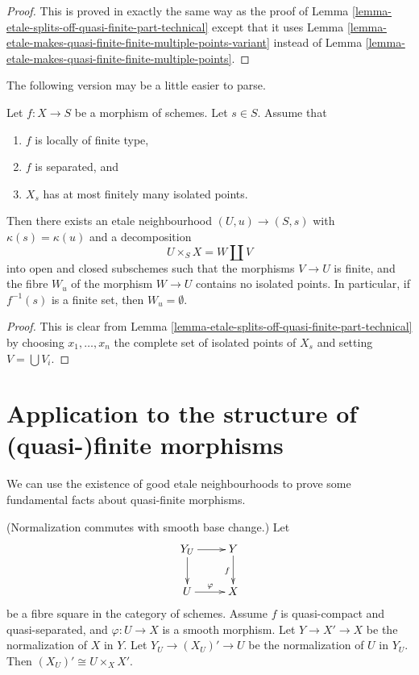 \begin{proof}
This is proved in exactly the same way as the proof of
Lemma \ref{lemma-etale-splits-off-quasi-finite-part-technical} except that it
uses Lemma \ref{lemma-etale-makes-quasi-finite-finite-multiple-points-variant}
instead of Lemma \ref{lemma-etale-makes-quasi-finite-finite-multiple-points}.
\end{proof}

\noindent
The following version may be a little easier to parse.

\begin{lemma}
\label{lemma-etale-splits-off-quasi-finite-part}
Let $f : X \to S$ be a morphism of schemes.
Let $s \in S$. Assume that
\begin{enumerate}
\item $f$ is locally of finite type,
\item $f$ is separated, and
\item $X_s$ has at most finitely many isolated points.
\end{enumerate}
Then there exists an etale neighbourhood $(U, u) \to (S, s)$
with $\kappa(s) = \kappa(u)$ and a decomposition
$$
U \times_S X = W \coprod V
$$
into open and closed subschemes such that the morphisms
$V \to U$ is finite, and the fibre $W_u$ of the
morphism $W \to U$ contains no isolated points.
In particular, if $f^{-1}(s)$ is a finite set, then $W_u = \emptyset$.
\end{lemma}

\begin{proof}
This is clear from
Lemma \ref{lemma-etale-splits-off-quasi-finite-part-technical}
by choosing $x_1, \ldots, x_n$ the complete set of
isolated points of $X_s$ and setting $V = \bigcup V_i$.
\end{proof}







\section{Application to the structure of (quasi-)finite morphisms}
\label{section-application-etale-neighbourhoods}

\noindent
We can use the existence of good etale neighbourhoods to prove
some fundamental facts about quasi-finite morphisms.

\begin{lemma}
\label{lemma-normalization-smooth-localization}
(Normalization commutes with smooth base change.) Let
$$
\xymatrix{
Y_U \ar[r] \ar[d] & Y \ar[d]_f \\
U \ar[r]^\varphi & X
}
$$
be a fibre square in the category of schemes.
Assume $f$ is quasi-compact and quasi-separated,
and $\varphi : U \to X$ is a smooth morphism.
Let $Y \to X' \to X$ be the normalization of $X$ in $Y$.
Let $Y_U \to (X_U)' \to U$ be the normalization of $U$ in $Y_U$.
Then $(X_U)' \cong U \times_X X'$.
\end{lemma}

